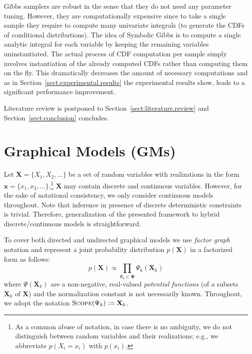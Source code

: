 \documentclass{article}
\renewcommand{\vec}[1]{\mathbf{#1}}
\newcommand{\bvec}[1]{\textbf{#1}}
\newcommand{\pr}{p}
\begin{document}
Gibbs samplers are robust in the sense that they do not need any parameter tuning.
However, they are computationally expensive since to take a single sample they require to compute many univariate integrals (to generate the CDFs of conditional distributions).
The idea of Symbolic Gibbs is to compute a single analytic integral for each variable by keeping the remaining variables uninstantiated. 
The actual process of CDF computation per sample  
simply involves instantiation of the already computed CDFs rather than computing them on the fly.
This dramatically decreases the amount of necessary computations and as in Section~\ref{sect:experimental.results} the experimental results show, leads to a significant performance improvement. 

Literature review is postponed to Section~\ref{sect:literature.review} and Section~\ref{sect:conclusion} concludes. 


\section{Graphical Models (GMs)}
\label{sect:background}
Let $\vec{X} = \{X_1, X_2, \ldots\}$ be a set of random variables with realizations in the form 
$\vec{x} = \{x_1, x_2, \ldots\}$.\footnote{
As a common abuse of notation, in case there is no ambiguity, we do not distinguish between random variables and their realizations; e.g., we abbreviate $\pr(X_i = x_i)$ with $\pr(x_i)$.}
$\vec{X}$ may contain discrete and continuous variables. 
However, for the sake of notational consistency, %
we only consider continuous models throughout. 
Note that inference in presence of discrete deterministic constraints is trivial.
Therefore, generalization of the presented framework to hybrid discrete/continuous models is straightforward.   

To cover both directed and undirected graphical models we use
\emph{factor graph} notation \cite{kschischang2001factor}
and represent a joint probability distribution $\pr(\vec{X})$ in a factorized form as follows: 
\begin{equation}
\label{e:factor-graph}
\pr(\vec{X}) \propto \prod_{\Psi_k \in \boldsymbol\Psi} \Psi_k (\vec{X}_k)
\end{equation}
where 
$\Psi(\vec{X}_k)$ are a non-negative, real-valued \emph{potential functions} (of a subsets $\bvec{X}_k$ of $\vec{X}$) and the normalization constant is not necessarily known.
Throughout, we adopt the notation 
$\textsc{Scope}(\Psi_k) := \bvec{X}_k$.
\end{document}
